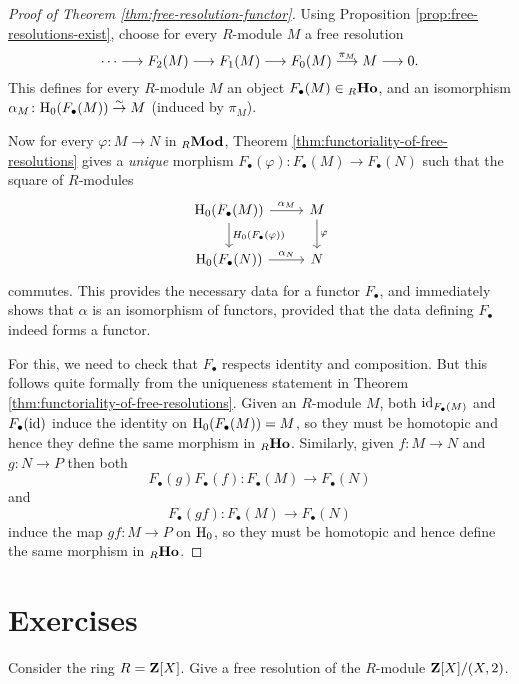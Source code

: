 \begin{proof}[Proof of Theorem \ref{thm:free-resolution-functor}]
Using Proposition \ref{prop:free-resolutions-exist}, choose for every $R$-module $M$  a free resolution
\[
	\cdots \longrightarrow F_2(M) \longrightarrow F_1(M) \longrightarrow F_0(M) \overset{\pi_M} {\longrightarrow} M \longrightarrow 0.
\]
This defines for every $R$-module $M$ an object $F_\bullet(M) \in {}_R\mathbf{Ho}$, and an isomorphism
$\alpha_M\colon {\mathrm H}_0(F_\bullet(M)) \overset{\sim}{\to} M$ (induced by $\pi_M$).

Now for every $\varphi\colon M\to N$ in ${}_R\mathbf{Mod}$, Theorem \ref{thm:functoriality-of-free-resolutions} gives
a \emph{unique} morphism $F_\bullet(\varphi) \colon F_\bullet(M) \to F_\bullet(N)$ such that the square
of $R$-modules
\[
\begin{tikzcd}
\rH_0(F_\bullet(M)) \arrow{r}{\alpha_M} \arrow{d}{H_0(F_\bullet(\varphi))} & M \arrow{d}{\varphi} \\
\rH_0(F_\bullet(N)) \arrow{r}{\alpha_N} & N
\end{tikzcd}
\]
commutes. This provides the necessary data for a functor $F_\bullet$, and immediately shows that $\alpha$ is an isomorphism of functors, provided that the data defining $F_\bullet$ indeed forms a functor.

For this, we need to check that $F_\bullet$ respects identity and composition. But this follows quite formally from the uniqueness statement in Theorem \ref{thm:functoriality-of-free-resolutions}. Given an $R$-module $M$, both ${\rm id}_{F_\bullet(M)}$ and $F_\bullet({\rm id})$ induce the identity on ${\mathrm H}_0(F_\bullet(M))=M$, so they must be homotopic and hence they define the same morphism in ${}_R\mathbf{Ho}$. Similarly, given $f\colon M\to N$ and $g\colon N\to P$ then both
\[
	F_\bullet(g) F_\bullet(f)\colon F_\bullet(M) \to F_\bullet(N)
\]
and
\[
	F_\bullet(gf)\colon F_\bullet(M) \to F_\bullet(N)
\]
induce the map $gf\colon M\to P$ on ${\mathrm H}_0$, so they must be homotopic and hence define the same morphism in ${}_R\mathbf{Ho}$.
\end{proof}



\newpage
\section*{Exercises}

\begin{exercise}
Consider the ring $R={\mathbf{Z}}[X]$. Give a free resolution of the $R$-module ${\mathbf{Z}}[X]/(X,2)$.
\end{exercise}

